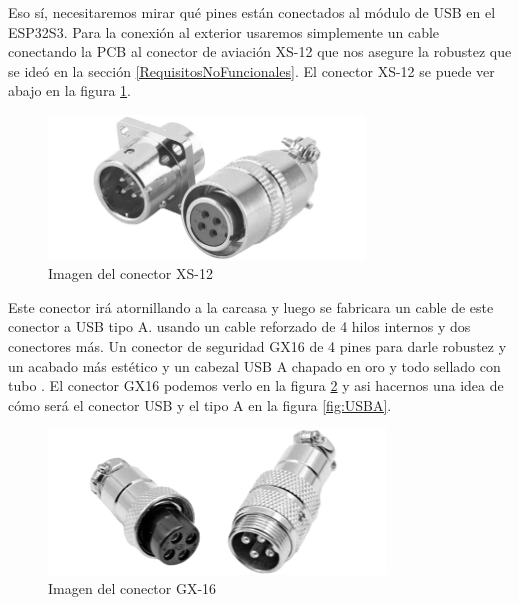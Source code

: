 Eso sí, necesitaremos mirar qué pines están conectados al módulo de \gls{USB} en el ESP32S3. Para la conexión al exterior usaremos simplemente un cable conectando la \gls{PCB} al conector de aviación XS-12 que nos asegure la robustez que se ideó en la sección \ref{RequisitosNoFuncionales}. El conector XS-12 se puede ver abajo en la figura \ref{fig:XS12}.

\begin{figure}[H]
    \centering
    \includegraphics[width=0.75\textwidth]{imagenes/Capitulos/Cap03/XS12.png}
    \caption{Imagen del conector XS-12}
    \label{fig:XS12}
\end{figure}

Este conector irá atornillando a la carcasa y luego se fabricara un cable de este conector a \gls{USB} tipo A. usando un cable reforzado de 4 hilos internos y dos conectores más. Un conector de seguridad GX16 de 4 pines para darle robustez y un acabado más estético y un cabezal \gls{USB} A chapado en oro y todo sellado con tubo . El conector GX16 podemos verlo en la figura \ref{fig:GX16} y asi hacernos una idea de cómo será el conector \gls{USB} y el tipo A en la figura \ref{fig:USBA}.

\begin{figure}[H]
    \centering
    \includegraphics[width=0.8\textwidth]{imagenes/Capitulos/Cap03/GX16.png}
    \caption{Imagen del conector GX-16}
    \label{fig:GX16}
\end{figure}

